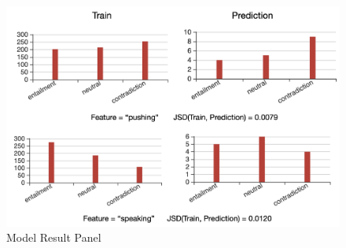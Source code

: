 \begin{figure}[th]
\centering
\includegraphics[width=1.0\columnwidth]{picture/model_result.jpg}
\caption{Model Result Panel}
\label{fig:model_result}
\end{figure}

